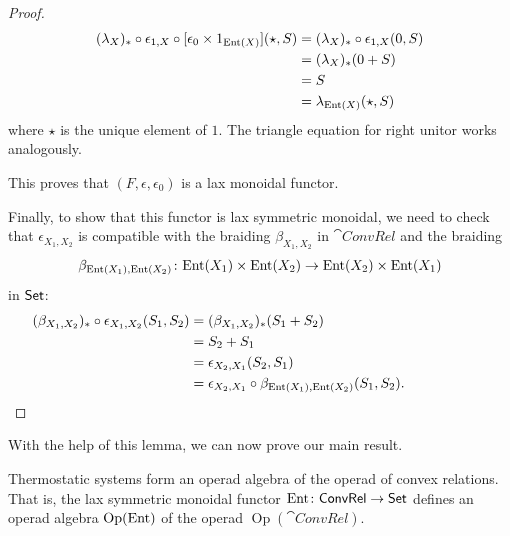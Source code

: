 \documentclass[12pt, reqno]{amsart}
\DeclareMathOperator{\Op}{Op}
\newcommand{\convrelC}{\cat{ConvRel}}
\begin{document}
\begin{proof}
    \begin{align*}
        (\lambda_X)_* \circ \epsilon_{1, X} \circ [\epsilon_0 \times 1_{\mathrm{Ent}(X)}] (\star, S)
        &= (\lambda_X)_* \circ \epsilon_{1, X} (0, S)
        \\&= (\lambda_X)_* (0+S)
        \\&= S
        \\&= \lambda_{\mathrm{Ent}(X)}(\star, S)
    \end{align*}
    where $\star$ is the unique element of $1$. The triangle equation for right unitor works analogously.

    This proves that $(F,\epsilon,\epsilon_0)$ is a lax monoidal functor. 
    
    Finally, to show that this functor is lax symmetric monoidal, we need to check that $\epsilon_{X_1,X_2}$ is compatible with the braiding $\beta_{X_1,X_2}$ in $\convrelC$ and the braiding \[\beta_{\mathrm{Ent}(X_1),\mathrm{Ent}(X_2)} \colon \mathrm{Ent}(X_1) \times \mathrm{Ent}(X_2) \rightarrow \mathrm{Ent}(X_2) \times \mathrm{Ent}(X_1)\] in $\mathsf{Set}$:
    \begin{align*}
        (\beta_{X_1, X_2})_* \circ \epsilon_{X_1, X_2} (S_1, S_2)
        &= (\beta_{X_1, X_2})_* (S_1+S_2)
        \\&= S_2+S_1
        \\&= \epsilon_{X_2, X_1} (S_2, S_1)
        \\&= \epsilon_{X_2, X_1} \circ \beta_{\mathrm{Ent}(X_1), \mathrm{Ent}(X_2)}(S_1, S_2). \qquad \qquad \qquad \qedhere
    \end{align*}
\end{proof}

With the help of this lemma, we can now prove our main result.

\begin{theorem}
\label{thm:operad_algebra}  
Thermostatic systems form an operad algebra of the operad of convex relations. That is, the lax symmetric monoidal functor $\Ent \maps \convrelC \to \setC$ defines an operad algebra $\Op(\Ent)$ of the operad $\Op(\convrelC)$.
\end{theorem}
\end{document}
